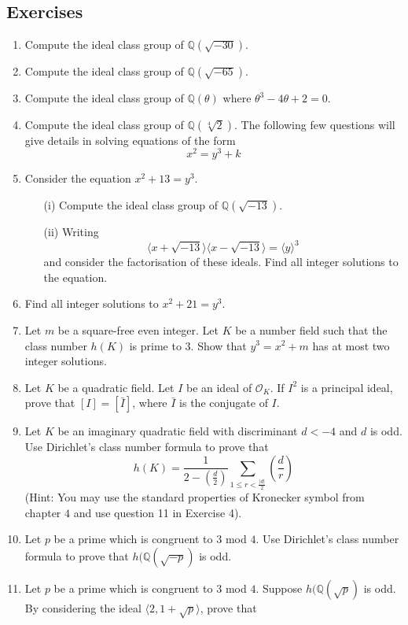 \subsection{Exercises}
\begin{enumerate}
\item Compute the ideal class group of $\mathbb{Q}(\sqrt{-30})$.
\item Compute the ideal class group of $\mathbb{Q}(\sqrt{-65})$.
\item Compute the ideal class group of $\mathbb{Q}(\theta)$ where $\theta^3-4\theta+2=0$.
\item Compute the ideal class group of $\mathbb{Q}(\sqrt[4]{2})$.
The following few questions will give details in solving equations of the form
$$x^2=y^3+k$$
\item Consider the equation $x^2+13=y^3$.
\begin{enumerate}
\item[(i)] Compute the ideal class group of $\mathbb{Q}(\sqrt{-13})$.
\item[(ii)] Writing
$$\langle x+\sqrt{-13} \rangle \langle x-\sqrt{-13} \rangle =\langle y \rangle^3$$
and consider the factorisation of these ideals. Find all integer solutions to the equation.
\end{enumerate}
\item Find all integer solutions to $x^2+21=y^3$.
\item Let $m$ be a square-free even integer. Let $K$ be a number field such that the class number $h(K)$ is prime to
$3$. Show that $y^3=x^2+m$ has at most two integer solutions.
\item Let $K$ be a quadratic field. Let $I$ be an ideal of $\mathcal{O}_K$. If $I^2$ is a principal ideal, prove that
$[I]=[\bar{I}]$, where $\bar{I}$ is the conjugate of $I$.
\item Let $K$ be an imaginary quadratic field with discriminant $d<-4$ and $d$ is odd. Use Dirichlet's class number formula to prove
that
$$h(K)=\frac{1}{2-\left(\frac{d}{2}\right)}\sum_{1 \le r< \frac{|d|}{2}} \left(\frac{d}{r}\right)$$
(Hint: You may use the standard properties of Kronecker symbol from chapter $4$ and use question 11 in Exercise 4).
\item Let $p$ be a prime which is congruent to $3$ mod $4$. Use Dirichlet's class number formula to prove that
$h(\mathbb{Q}(\sqrt{-p})$ is odd.
\item Let $p$ be a prime which is congruent to $3$ mod $4$. Suppose $h(\mathbb{Q}(\sqrt{p})$ is odd. By considering the ideal $\langle 2,1+\sqrt{p} \rangle$, prove that

\end{enumerate}
